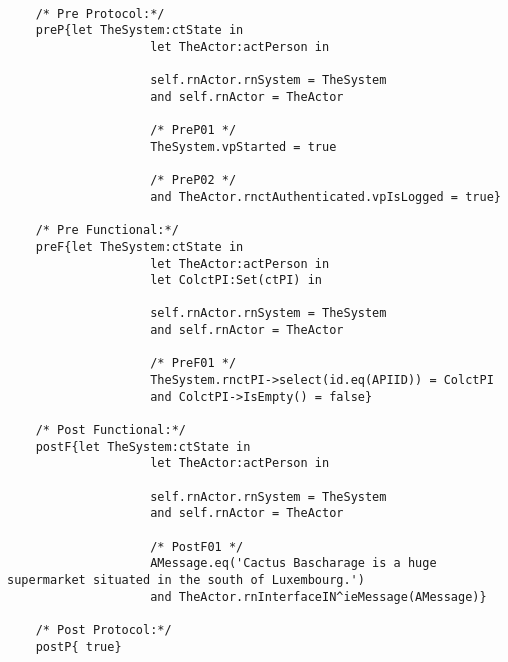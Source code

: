 	\scriptsize
	\vspace{0.5cm}
	\begin{lstlisting}[style=MessirStyle,firstnumber=auto,captionpos=b,caption={\msrmessir (MCL-oriented) specification of the operation \emph{oeGetDescription}.},label=OM-actPerson-oeGetDescription-MCL-LST]

	/* Pre Protocol:*/ 
	preP{let TheSystem:ctState in
					let TheActor:actPerson in
					
					self.rnActor.rnSystem = TheSystem
					and self.rnActor = TheActor
					
					/* PreP01 */
					TheSystem.vpStarted = true
					
					/* PreP02 */
					and TheActor.rnctAuthenticated.vpIsLogged = true}
	
	/* Pre Functional:*/
	preF{let TheSystem:ctState in
					let TheActor:actPerson in
					let ColctPI:Set(ctPI) in
					
					self.rnActor.rnSystem = TheSystem
					and self.rnActor = TheActor
					
					/* PreF01 */
					TheSystem.rnctPI->select(id.eq(APIID)) = ColctPI
					and ColctPI->IsEmpty() = false}
	
	/* Post Functional:*/ 
	postF{let TheSystem:ctState in
					let TheActor:actPerson in
					
					self.rnActor.rnSystem = TheSystem
					and self.rnActor = TheActor
					
					/* PostF01 */
					AMessage.eq('Cactus Bascharage is a huge supermarket situated in the south of Luxembourg.')
					and TheActor.rnInterfaceIN^ieMessage(AMessage)}
	
	/* Post Protocol:*/ 
	postP{ true}
	
	\end{lstlisting}
	\normalsize 
	
	
	
	





